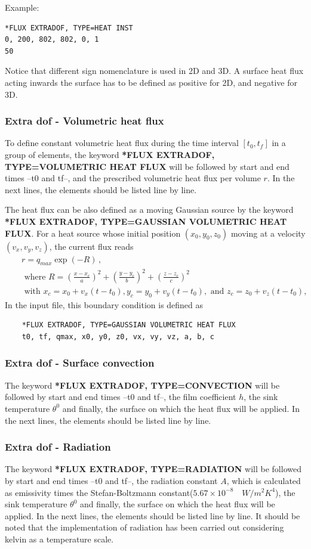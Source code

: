 \documentclass[oneside,11pt,times]{book}
\begin{document}
Example:
\begin{lstlisting}
*FLUX EXTRADOF, TYPE=HEAT INST
0, 200, 802, 802, 0, 1
50
\end{lstlisting}
Notice that different sign nomenclature is used in 2D and 3D. A surface heat flux acting inwards the surface has to be defined as positive for 2D, and negative for 3D.

\subsubsection{Extra dof - Volumetric heat flux}

To define constant volumetric heat flux during the time interval $[t_0, t_f]$ in a group of elements, the keyword \textbf{*FLUX EXTRADOF, TYPE=VOLUMETRIC HEAT FLUX} will be followed by start and end times --t0 and tf--, and the prescribed volumetric heat flux  per volume $r$. In the next lines, the elements should be listed line by line.

The heat flux can be also defined as a moving Gaussian source by the keyword \textbf{*FLUX EXTRADOF, TYPE=GAUSSIAN VOLUMETRIC HEAT FLUX}. For a heat source whose initial position $(x_0,y_0,z_0)$ moving at a velocity $(v_x, v_y, v_z)$, the current flux reads
\begin{eqnarray}
	&&r = q_{max}\exp(-R)\,, \\
	&& \text{ where } R = (\frac{x-x_c}{a})^2 + (\frac{y-y_c}{b})^2+(\frac{z-z_c}{c})^2 \\
	&&\text{ with } x_c = x_0+v_x(t-t_0),  y_c = y_0+v_y(t-t_0),  \text{ and }  z_c = z_0+v_z(t-t_0),  
\end{eqnarray}
In the input file, this boundary condition is defined as
\begin{lstlisting}
	*FLUX EXTRADOF, TYPE=GAUSSIAN VOLUMETRIC HEAT FLUX
	t0, tf, qmax, x0, y0, z0, vx, vy, vz, a, b, c
\end{lstlisting}


\subsubsection{Extra dof - Surface convection}

The keyword \textbf{*FLUX EXTRADOF, TYPE=CONVECTION} will be followed by start and end times --t0 and tf--, the film coefficient $h$, the sink temperature $\theta^0$ and finally, the surface on which the heat flux will be applied. In the next lines, the elements should be listed line by line.

\subsubsection{Extra dof - Radiation}
The keyword \textbf{*FLUX EXTRADOF, TYPE=RADIATION} will be followed by start and end times --t0 and tf--, the radiation constant $A$, which is calculated as emissivity times the Stefan-Boltzmann constant($5.67 \times 10^{-8}\quad W/m^2 K^4$), the sink temperature $\theta^0$ and finally, the surface on which the heat flux will be applied. In the next lines, the elements should be listed line by line. It should be noted that the implementation of radiation has been carried out considering kelvin as a temperature scale.
\end{document}
